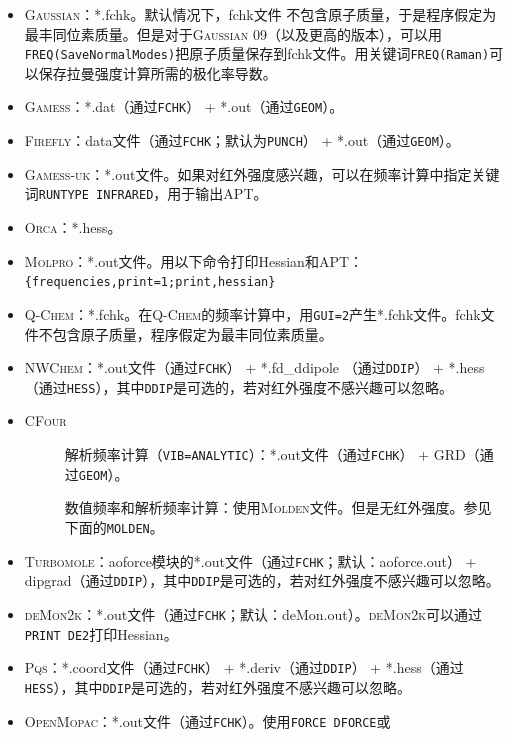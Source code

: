 \documentclass[12pt,a4paper,openany,twoside,cap]{ctexbook}
\begin{document}
\begin{itemize}
\item \textsc{Gaussian}：*.fchk。默认情况下，fchk文件 不包含原子质量，于是程序假定为最丰同位素质量。但是对于\textsc{Gaussian} 09（以及更高的版本），可以用\texttt{FREQ(SaveNormalModes)}把原子质量保存到fchk文件。用关键词\texttt{FREQ(Raman)}可以保存拉曼强度计算所需的极化率导数。
\item \textsc{Gamess}：*.dat（通过\verb|FCHK|） + *.out（通过\verb|GEOM|）。
\item \textsc{Firefly}：data文件（通过\verb|FCHK|；默认为\verb|PUNCH|） + *.out（通过\verb|GEOM|）。
\item \textsc{Gamess-uk}：*.out文件。如果对红外强度感兴趣，可以在频率计算中指定关键词\texttt{RUNTYPE INFRARED}，用于输出APT。
\item \textsc{Orca}：*.hess。
\item \textsc{Molpro}：*.out文件。用以下命令打印Hessian和APT： \\
\verb|{frequencies,print=1;print,hessian}|
\item \textsc{Q-Chem}：*.fchk。在\textsc{Q-Chem}的频率计算中，用\texttt{GUI=2}产生*.fchk文件。fchk文件不包含原子质量，程序假定为最丰同位素质量。
\item \textsc{NWChem}：*.out文件（通过\verb|FCHK|） + *.fd{\_}ddipole （通过\verb|DDIP|） +
*.hess （通过\verb|HESS|），其中\verb|DDIP|是可选的，若对红外强度不感兴趣可以忽略。
\item \textsc{CFour}
  \begin{description}
  \item[ ]解析频率计算（\texttt{VIB=ANALYTIC}）：*.out文件（通过\verb|FCHK|） + GRD（通过\verb|GEOM|）。
  \item[ ]数值频率和解析频率计算：使用\textsc{Molden}文件。但是无红外强度。参见下面的\texttt{MOLDEN}。
  \end{description}
\item \textsc{Turbomole}：aoforce模块的*.out文件（通过\verb|FCHK|；默认：aoforce.out） +
dipgrad（通过\verb|DDIP|），其中\verb|DDIP|是可选的，若对红外强度不感兴趣可以忽略。
\item \textsc{deMon2k}：*.out文件（通过\verb|FCHK|；默认：deMon.out）。\textsc{deMon2k}可以通过\texttt{PRINT DE2}打印Hessian。
\item \textsc{Pqs}：*.coord文件（通过\verb|FCHK|） + *.deriv（通过\verb|DDIP|） + *.hess（通过\verb|HESS|），其中\verb|DDIP|是可选的，若对红外强度不感兴趣可以忽略。
\item \textsc{OpenMopac}：*.out文件（通过\verb|FCHK|）。使用\texttt{FORCE DFORCE}或

\end{itemize}
\end{document}
